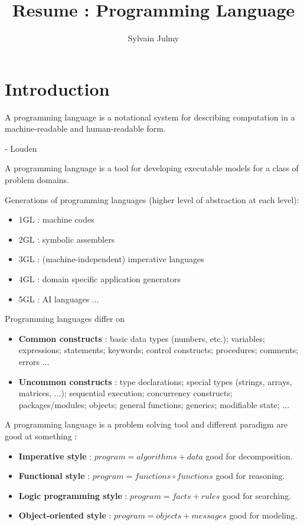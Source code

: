 \documentclass[a4paper,11pt]{article}
\title{Resume : Programming Language}
\author{Sylvain Julmy}
\begin{document}
\maketitle

\section{Introduction}

\begin{tcolorbox}[title=What is a Programming Language ?]
A programming language is a notational system for describing computation in a
machine-readable and human-readable form.

- Louden
\end{tcolorbox}

A programming language is a tool for developing executable models for a class of
problem domains.

Generations of programming languages (higher level of abstraction at each level):
\begin{itemize}
\item 1GL : machine codes
\item 2GL : symbolic assemblers
\item 3GL : (machine-independent) imperative languages
\item 4GL : domain specific application generators
\item 5GL : AI languages ...
\end{itemize}

Programming languages differ on
\begin{itemize}
\item \textbf{Common constructs} : basic data types (numbers, etc.); variables;
  expressions; statements; keywords; control constructs; procedures; comments;
  errors ...
\item \textbf{Uncommon constructs} : type declarations; special types (strings, arrays,
  matrices, ...); sequential execution; concurrency constructs;
  packages/modules; objects; general functions; generics; modifiable state; ...
\end{itemize}

A programming language is a problem solving tool and different paradigm are good
at something :
\begin{itemize}
\item \textbf{Imperative style} : $program = algorithms + data$ good for decomposition.
\item \textbf{Functional style} : $program = functions \circ functions$ good for
  reasoning.
\item \textbf{Logic programming style} : $program = facts + rules$ good for searching.
\item \textbf{Object-oriented style} : $program = objects + messages$ good for modeling.
\end{itemize}
\end{document}
